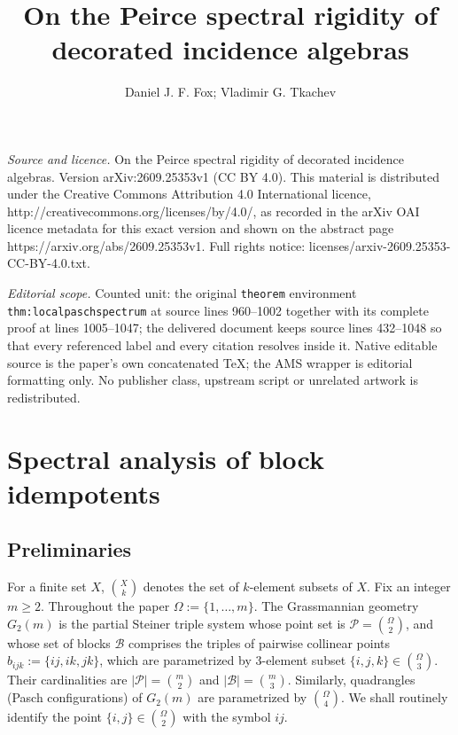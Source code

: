 \documentclass[10pt,a4paper]{amsart}
\numberwithin{equation}{section}
\begin{document}
\title[On the Peirce spectral rigidity of decorated incidence algeb]{On the Peirce spectral rigidity of decorated incidence algebras}
\author{Daniel J. F. Fox; Vladimir G. Tkachev}
\date{}
\maketitle
\noindent\emph{Source and licence.} On the Peirce spectral rigidity of decorated incidence algebras. Version arXiv:2609.25353v1 (CC BY 4.0). This material is distributed under the Creative Commons Attribution 4.0 International licence, http://creativecommons.org/licenses/by/4.0/, as recorded in the arXiv OAI licence metadata for this exact version and shown on the abstract page https://arxiv.org/abs/2609.25353v1. Full rights notice: licenses/arxiv-2609.25353-CC-BY-4.0.txt.\par\smallskip
\noindent\textit{Editorial scope.} Counted unit: the original \texttt{theorem} environment \texttt{thm:localpaschspectrum} at source lines 960--1002 together with its complete proof at lines 1005--1047; the delivered document keeps source lines 432--1048 so that every referenced label and every citation resolves inside it. Native editable source is the paper's own concatenated TeX; the AMS wrapper is editorial formatting only. No publisher class, upstream script or unrelated artwork is redistributed.
\section{Spectral analysis of block idempotents}

\subsection{Preliminaries}\label{sec:not}

For a finite set $X$, $\binom{X}{k}$ denotes the set of $k$-element subsets of $X$. Fix an integer $m\ge2$. Throughout the paper $\Omega:=\{1,\dots,m\}$.
The Grassmannian geometry $G_2(m)$ is the partial Steiner triple system whose point set is
$\mathcal P=\binom{\Omega}{2}$,
and whose set of blocks $\mathcal B$ comprises the triples of pairwise collinear points
$b_{ijk}:=\{ij,ik,jk\}$, which are parametrized by $3$-element subset $\{i,j,k\}\in\binom{\Omega}{3}$. Their cardinalities are $|\mathcal P|=\binom{m}{2}$ and $|\mathcal B|=\binom{m}{3}$.
Similarly, quadrangles (Pasch configurations) of $G_2(m)$ are parametrized by $\binom{\Omega}{4}$. We shall routinely identify the point $\{i,j\}\in\binom{\Omega}{2}$ with the symbol $ij$.
\end{document}
